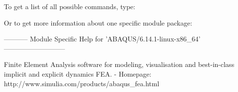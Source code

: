 To get a list of all possible commands, type:

\begin{prompt}
\end{prompt}

Or to get more information about one specific module package:

\begin{prompt}
----------- Module Specific Help for 'ABAQUS/6.14.1-linux-x86_64' ---------------------------

   Finite Element Analysis software for modeling, visualisation and best-in-class implicit and explicit dynamics FEA. - Homepage: http://www.simulia.com/products/abaqus_fea.html
\end{prompt}
